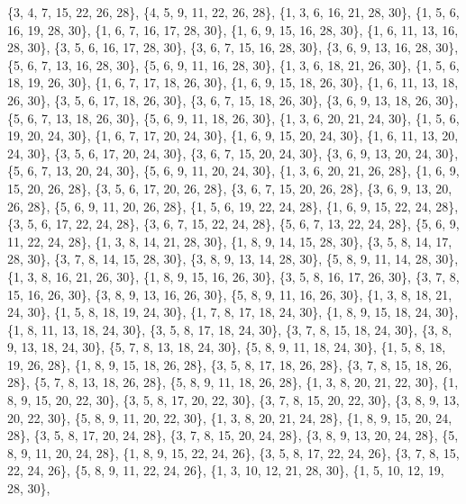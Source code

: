 \documentclass[11pt,a4paper]{article}
\begin{document}
{\{3, 4, 7, 15, 22, 26, 28\}, \{4, 5, 9, 11, 22, 26, 28\}, \{1, 3, 6, 16, 21, 28, 30\}, \{1, 5, 6, 16, 19, 28, 30\}, \{1, 6, 7, 16, 17, 28, 30\},
\{1, 6, 9, 15, 16, 28, 30\}, \{1, 6, 11, 13, 16, 28, 30\}, \{3, 5, 6, 16, 17, 28, 30\}, \{3, 6, 7, 15, 16, 28, 30\}, \{3, 6, 9, 13, 16, 28, 30\},
\{5, 6, 7, 13, 16, 28, 30\}, \{5, 6, 9, 11, 16, 28, 30\}, \{1, 3, 6, 18, 21, 26, 30\}, \{1, 5, 6, 18, 19, 26, 30\}, \{1, 6, 7, 17, 18, 26, 30\},
\{1, 6, 9, 15, 18, 26, 30\}, \{1, 6, 11, 13, 18, 26, 30\}, \{3, 5, 6, 17, 18, 26, 30\}, \{3, 6, 7, 15, 18, 26, 30\}, \{3, 6, 9, 13, 18, 26, 30\},
\{5, 6, 7, 13, 18, 26, 30\}, \{5, 6, 9, 11, 18, 26, 30\}, \{1, 3, 6, 20, 21, 24, 30\}, \{1, 5, 6, 19, 20, 24, 30\}, \{1, 6, 7, 17, 20, 24, 30\},
\{1, 6, 9, 15, 20, 24, 30\}, \{1, 6, 11, 13, 20, 24, 30\}, \{3, 5, 6, 17, 20, 24, 30\}, \{3, 6, 7, 15, 20, 24, 30\}, \{3, 6, 9, 13, 20, 24, 30\},
\{5, 6, 7, 13, 20, 24, 30\}, \{5, 6, 9, 11, 20, 24, 30\}, \{1, 3, 6, 20, 21, 26, 28\}, \{1, 6, 9, 15, 20, 26, 28\}, \{3, 5, 6, 17, 20, 26, 28\},
\{3, 6, 7, 15, 20, 26, 28\}, \{3, 6, 9, 13, 20, 26, 28\}, \{5, 6, 9, 11, 20, 26, 28\}, \{1, 5, 6, 19, 22, 24, 28\}, \{1, 6, 9, 15, 22, 24, 28\},
\{3, 5, 6, 17, 22, 24, 28\}, \{3, 6, 7, 15, 22, 24, 28\}, \{5, 6, 7, 13, 22, 24, 28\}, \{5, 6, 9, 11, 22, 24, 28\}, \{1, 3, 8, 14, 21, 28, 30\},
\{1, 8, 9, 14, 15, 28, 30\}, \{3, 5, 8, 14, 17, 28, 30\}, \{3, 7, 8, 14, 15, 28, 30\}, \{3, 8, 9, 13, 14, 28, 30\}, \{5, 8, 9, 11, 14, 28, 30\},
\{1, 3, 8, 16, 21, 26, 30\}, \{1, 8, 9, 15, 16, 26, 30\}, \{3, 5, 8, 16, 17, 26, 30\}, \{3, 7, 8, 15, 16, 26, 30\}, \{3, 8, 9, 13, 16, 26, 30\},
\{5, 8, 9, 11, 16, 26, 30\}, \{1, 3, 8, 18, 21, 24, 30\}, \{1, 5, 8, 18, 19, 24, 30\}, \{1, 7, 8, 17, 18, 24, 30\}, \{1, 8, 9, 15, 18, 24, 30\},
\{1, 8, 11, 13, 18, 24, 30\}, \{3, 5, 8, 17, 18, 24, 30\}, \{3, 7, 8, 15, 18, 24, 30\}, \{3, 8, 9, 13, 18, 24, 30\}, \{5, 7, 8, 13, 18, 24, 30\},
\{5, 8, 9, 11, 18, 24, 30\}, \{1, 5, 8, 18, 19, 26, 28\}, \{1, 8, 9, 15, 18, 26, 28\}, \{3, 5, 8, 17, 18, 26, 28\}, \{3, 7, 8, 15, 18, 26, 28\},
\{5, 7, 8, 13, 18, 26, 28\}, \{5, 8, 9, 11, 18, 26, 28\}, \{1, 3, 8, 20, 21, 22, 30\}, \{1, 8, 9, 15, 20, 22, 30\}, \{3, 5, 8, 17, 20, 22, 30\},
\{3, 7, 8, 15, 20, 22, 30\}, \{3, 8, 9, 13, 20, 22, 30\}, \{5, 8, 9, 11, 20, 22, 30\}, \{1, 3, 8, 20, 21, 24, 28\}, \{1, 8, 9, 15, 20, 24, 28\},
\{3, 5, 8, 17, 20, 24, 28\}, \{3, 7, 8, 15, 20, 24, 28\}, \{3, 8, 9, 13, 20, 24, 28\}, \{5, 8, 9, 11, 20, 24, 28\}, \{1, 8, 9, 15, 22, 24, 26\},
\{3, 5, 8, 17, 22, 24, 26\}, \{3, 7, 8, 15, 22, 24, 26\}, \{5, 8, 9, 11, 22, 24, 26\}, \{1, 3, 10, 12, 21, 28, 30\}, \{1, 5, 10, 12, 19, 28, 30\},
}
\end{document}

